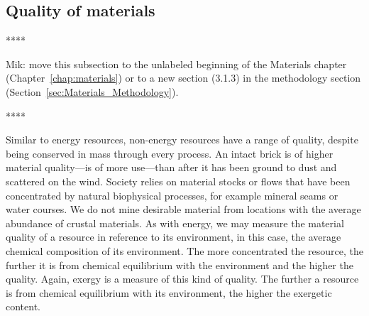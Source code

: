 \subsection{Quality of materials}
\label{sec:material_quality}


%
%

****

Mik: move this subsection to the unlabeled beginning of the Materials chapter
(Chapter~\ref{chap:materials}) or to a new section (3.1.3) in the 
methodology section (Section~\ref{sec:Materials_Methodology}).

**** 



Similar to energy resources, 
non-energy resources 
have a range of quality, despite being conserved
in mass through every process.
An intact brick is of higher material quality---is of more use---than
after it has been ground to dust and scattered on the wind.
Society relies on material stocks or flows 
that have been concentrated by natural biophysical processes,
for example mineral seams or water courses. 
We do not mine desirable material from locations with
the average abundance of crustal materials.
As with energy,
we may measure the material quality of a resource
in reference to its environment,
in this case,
the average chemical composition of
its environment.
The more concentrated the resource,
the further it is from chemical equilibrium
with the environment and the higher the quality.
Again, exergy is a measure of this kind of quality.
The further a resource is from chemical equilibrium
with its environment,
the higher the exergetic content.

